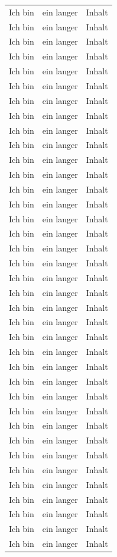 \documentclass[
12pt,
ngerman
]{scrreprt}
\begin{document}
\begin{longtable}{lcl}
  Ich bin & ein langer & Inhalt \\
  Ich bin & ein langer & Inhalt \\
  Ich bin & ein langer & Inhalt \\
  Ich bin & ein langer & Inhalt \\
  Ich bin & ein langer & Inhalt \\
  Ich bin & ein langer & Inhalt \\
  Ich bin & ein langer & Inhalt \\
  Ich bin & ein langer & Inhalt \\
  Ich bin & ein langer & Inhalt \\
  Ich bin & ein langer & Inhalt \\
  Ich bin & ein langer & Inhalt \\
  Ich bin & ein langer & Inhalt \\
  Ich bin & ein langer & Inhalt \\
  Ich bin & ein langer & Inhalt \\
  Ich bin & ein langer & Inhalt \\
  Ich bin & ein langer & Inhalt \\
  Ich bin & ein langer & Inhalt \\
  Ich bin & ein langer & Inhalt \\
  Ich bin & ein langer & Inhalt \\
  Ich bin & ein langer & Inhalt \\
  Ich bin & ein langer & Inhalt \\
  Ich bin & ein langer & Inhalt \\
  Ich bin & ein langer & Inhalt \\
  Ich bin & ein langer & Inhalt \\
  Ich bin & ein langer & Inhalt \\
  Ich bin & ein langer & Inhalt \\
  Ich bin & ein langer & Inhalt \\
  Ich bin & ein langer & Inhalt \\
  Ich bin & ein langer & Inhalt \\
  Ich bin & ein langer & Inhalt \\
  Ich bin & ein langer & Inhalt \\
  Ich bin & ein langer & Inhalt \\
  Ich bin & ein langer & Inhalt \\
  Ich bin & ein langer & Inhalt \\
  Ich bin & ein langer & Inhalt \\
  Ich bin & ein langer & Inhalt \\
  Ich bin & ein langer & Inhalt \\
\end{longtable}
\end{document}
